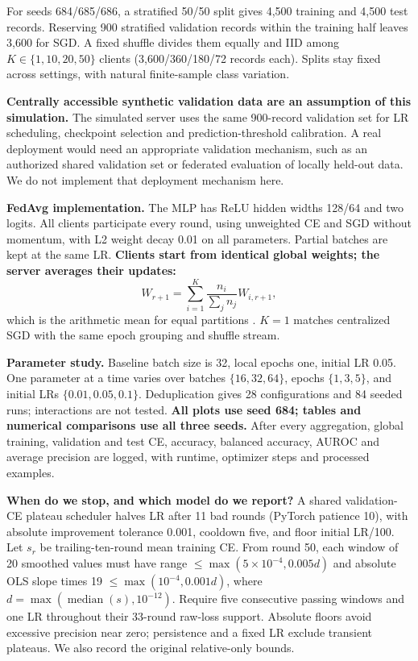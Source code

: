 \documentclass[10pt]{article}
\begin{document}
For seeds 684/685/686, a stratified 50/50 split gives 4,500 training and 4,500
test records. Reserving 900 stratified validation records within the training
half leaves 3,600 for SGD. A fixed shuffle divides them equally and IID among
$K\in\{1,10,20,50\}$ clients (3,600/360/180/72 records each). Splits stay fixed
across settings, with natural finite-sample class variation.

\textbf{Centrally accessible synthetic validation data are an assumption of this
simulation.} The simulated server uses the same 900-record validation set for
LR scheduling, checkpoint selection and prediction-threshold calibration.
A real deployment would need an appropriate validation mechanism, such as an
authorized shared validation set or federated evaluation of locally held-out
data. We do not implement that deployment mechanism here.

\textbf{FedAvg implementation.} The MLP has ReLU hidden widths 128/64 and two
logits. All clients participate every round, using unweighted CE and SGD without
momentum, with L2 weight decay 0.01 on all parameters. Partial batches are kept
at the same LR.
\textbf{Clients start from identical global weights; the server averages their updates:}
\[
W_{r+1}=\sum_{i=1}^{K}\frac{n_i}{\sum_j n_j}W_{i,r+1},
\]
which is the arithmetic mean for equal partitions \cite{fedavg}.
$K=1$ matches centralized SGD with the same epoch grouping and shuffle stream.

\textbf{Parameter study.} Baseline batch size is 32, local epochs one, initial LR 0.05. One parameter at a
time varies over batches $\{16,32,64\}$, epochs $\{1,3,5\}$, and initial LRs
$\{0.01,0.05,0.1\}$. Deduplication gives 28 configurations and 84 seeded runs;
interactions are not tested. \textbf{All plots use seed 684; tables and numerical
comparisons use all three seeds.} After every aggregation, global training,
validation and test CE, accuracy, balanced accuracy, AUROC and average precision
are logged, with runtime, optimizer steps and processed examples.

\textbf{When do we stop, and which model do we report?} A shared validation-CE plateau
scheduler halves LR after 11 bad rounds (PyTorch patience 10), with absolute
improvement tolerance 0.001, cooldown five, and floor initial LR/100.
Let $s_r$ be trailing-ten-round mean training CE. From round 50, each window of
20 smoothed values must have range $\leq\max(5\times10^{-4},0.005d)$ and absolute
OLS slope times 19 $\leq\max(10^{-4},0.001d)$, where
$d=\max(\operatorname{median}(s),10^{-12})$. Require five consecutive passing
windows and one LR throughout their 33-round raw-loss support. Absolute floors avoid excessive precision near zero; persistence and a fixed LR
exclude transient plateaus. We also record the original relative-only bounds.
\end{document}
